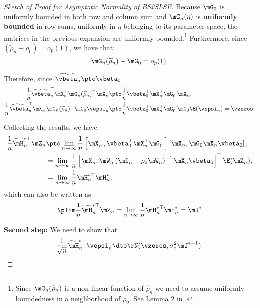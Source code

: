 \begin{proof}[Sketch of Proof for Asymptotic Normality of BS2SLSE]
Because $\mG_0$ is uniformly bounded in both row and column sum and $\mG_n(\eta)$ is \textbf{uniformly bounded} in row sums, uniformly in $\eta$ belonging to its parameter space, the matrices in the previous expansion are uniformly bounded.\footnote{Since $\mG_n(\widetilde{\rho}_n)$ is a non-linear function of $\widehat{\rho}_n$ we need to assume uniformly boundedness in a neighborhood of $\rho_0$. See Lemma 2 in \cite{lee2003best}.} Furthermore, since $\left(\widetilde{\rho}_n - \rho_0\right) = o_p(1)$, we have that:
\begin{equation*}
\mG_n(\widetilde{\rho}_n) -  \mG_0  = o_p(1).
\end{equation*}

Therefore, since $\widetilde{\vbeta}_n\pto \vbeta_0$
\begin{equation*}
\begin{aligned}
\frac{1}{n}\widetilde{\vbeta}^\top_n\mX_n^\top \mG_n(\widetilde{\rho}_n)^\top\mX_n & \pto \frac{1}{n}\vbeta_0^\top\mX_n^\top \mG_0^\top\mX_n, \\
\frac{1}{n}\widetilde{\vbeta}^\top_n\mX_n^\top \mG_n(\widetilde{\rho}_n)^\top\mG_0\vepsi_n & \pto \frac{1}{n}\vbeta_0^\top\mX_n^\top \mG_0^\top\mG_0\E(\vepsi_n) = \vzeros.
\end{aligned}
\end{equation*}

Collecting the results, we have
\begin{equation*}
\begin{aligned}
  \frac{1}{n}\widetilde{\mH}^{*\top}_n \mZ_n & \pto \lim_{n \to \infty}\frac{1}{n}\left[ \mX_n^\top,  \vbeta_0^\top\mX_n^\top\mG_0^\top\right] \left[\mX_n, \mG_0\mX_n\vbeta_0\right], \\
   & = \lim_{n \to \infty}\frac{1}{n}\left[\mX_n, \mW_n\left(\mI_n - \rho_0\mW_n\right)^{-1}\mX_n\vbeta_0\right]^\top\E(\mZ_n), \\
   & = \lim_{n \to \infty} \frac{1}{n}\mH^{*\top}_n\mH^{*}_n,
  \end{aligned}
\end{equation*}
%
which can also be written as
\begin{equation*}
\plim \frac{1}{n}\widetilde{\mH}^{*\top}_n \mZ_n  = \lim_{n \to \infty} \frac{1}{n}\mH^{*\top}_n\mH^{*}_n = \mJ^*
\end{equation*}


\textbf{Second step:} We need to show that
\begin{equation*}
\frac{1}{\sqrt{n}}\widetilde{\mH}_n^{*\top}\vepsi_n \dto \rN(\vzeros, \sigma_{\epsilon}^2\mJ^{*-1}). 
\end{equation*}


\end{proof}
